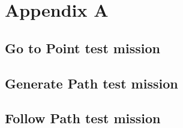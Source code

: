 \chapter{Appendix A}

\section{Go to Point test mission} \label{app1:go_to_point_mission}

 

\section{Generate Path test mission} \label{app1:generate_path_mission}

 

\section{Follow Path test mission} \label{app1:follow_path_mission}



\begin{comment}
  \begin{itemize}
  \end{itemize}
\end{comment}


